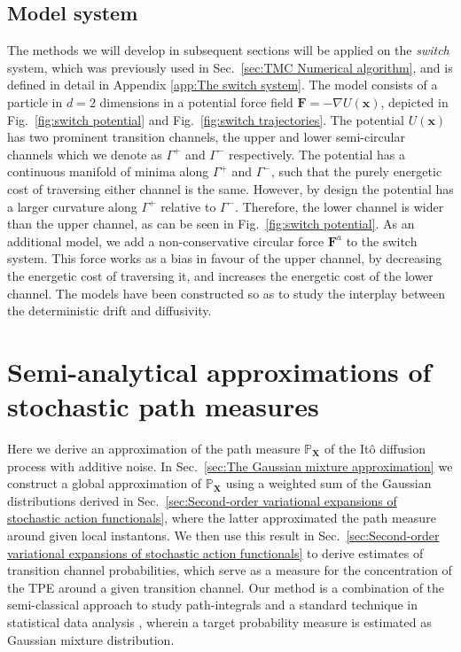 \subsection{Model system}

The methods we will develop in subsequent sections will be applied on the \textit{switch} system, which was previously used in Sec.~\ref{sec:TMC Numerical algorithm}, and is defined in detail in Appendix \ref{app:The switch system}.
The model consists of a particle in $d=2$ dimensions in a potential force field $\mathbf{F}=-\nabla U(\mathbf{x})$, depicted in Fig.~\ref{fig:switch potential} and Fig.~\ref{fig:switch trajectories}.
The potential $U(\mathbf{x})$ has two prominent transition channels, the upper and lower semi-circular channels which we denote as $\Gamma^{+}$ and $\Gamma^{-}$ respectively. The potential has a continuous manifold of minima along $\Gamma^{+}$ and $\Gamma^{-}$, such that the purely energetic cost of traversing either channel is the same. However, by design the potential has a larger curvature along $\Gamma^{+}$ relative to $\Gamma^{-}$. Therefore, the lower channel is wider than the upper channel, as can be seen in Fig.~\ref{fig:switch potential}. As an additional model, we add a non-conservative circular force $\mathbf{F}^{a}$ to the switch system. This force works as a bias in favour of the upper channel, by decreasing the energetic cost of traversing it, and increases the energetic cost of the lower channel. The models have been constructed so as to study the interplay between the deterministic drift and diffusivity.

\section{Semi-analytical approximations of stochastic path measures} \label{sec:Semi-analytical approximations of stochastic path measures}

Here we derive an approximation of the path measure $\mathbb{P}_\mathbf{X}$ of the It\^{o} diffusion process with additive noise. In Sec.~\ref{sec:The Gaussian mixture approximation} we construct a global approximation of $\mathbb{P}_\mathbf{X}$ using a weighted sum of the Gaussian distributions derived in Sec.~\ref{sec:Second-order variational expansions of stochastic action functionals}, where the latter approximated the path measure around given local instantons. We then use this result in Sec.~\ref{sec:Second-order variational expansions of stochastic action functionals} to derive estimates of transition channel probabilities, which serve as a measure for the concentration of the TPE around a given transition channel. Our method is a combination of the semi-classical approach to study path-integrals \citep{chaichianPathIntegralsPhysics2001, schulmanTechniquesApplicationsPath1996, smirnovEstimationPathIntegral2010, moretteDefinitionApproximationFeynman1951, marinovPathIntegralsQuantum1980, sakuraiModernQuantumMechanics2017} and a standard technique in statistical data analysis \citep{gelmanBayesianDataAnalysis, scottMultivariateDensityEstimation2015, goodfellowDeepLearning2016, nguyenApproximationFiniteMixtures2020, perpinanModefindingMixturesGaussian2000}, wherein a target probability measure is estimated as Gaussian mixture distribution. 

